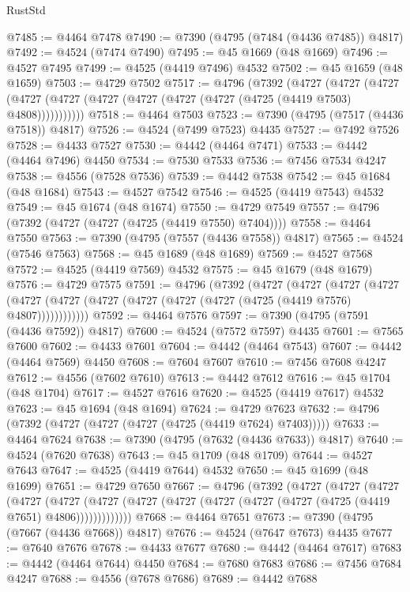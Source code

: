\begin{lexlean}{RustStd}
\begin{coremodule}
@7485 := @4464 @7478
@7490 := @7390 (@4795 (@7484 (@4436 @7485)) @4817)
@7492 := @4524 (@7474 @7490)
@7495 := @45 @1669 (@48 @1669)
@7496 := @4527 @7495
@7499 := @4525 (@4419 @7496) @4532
@7502 := @45 @1659 (@48 @1659)
@7503 := @4729 @7502
@7517 := @4796
    (@7392
      (@4727
        (@4727
          (@4727 (@4727 (@4727 (@4727 (@4727 (@4727 (@4727 (@4725 (@4419 @7503) @4808)))))))))))
@7518 := @4464 @7503
@7523 := @7390 (@4795 (@7517 (@4436 @7518)) @4817)
@7526 := @4524 (@7499 @7523) @4435
@7527 := @7492 @7526
@7528 := @4433 @7527
@7530 := @4442 (@4464 @7471)
@7533 := @4442 (@4464 @7496) @4450
@7534 := @7530 @7533
@7536 := @7456 @7534 @4247
@7538 := @4556 (@7528 @7536)
@7539 := @4442 @7538
@7542 := @45 @1684 (@48 @1684)
@7543 := @4527 @7542
@7546 := @4525 (@4419 @7543) @4532
@7549 := @45 @1674 (@48 @1674)
@7550 := @4729 @7549
@7557 := @4796 (@7392 (@4727 (@4727 (@4725 (@4419 @7550) @7404))))
@7558 := @4464 @7550
@7563 := @7390 (@4795 (@7557 (@4436 @7558)) @4817)
@7565 := @4524 (@7546 @7563)
@7568 := @45 @1689 (@48 @1689)
@7569 := @4527 @7568
@7572 := @4525 (@4419 @7569) @4532
@7575 := @45 @1679 (@48 @1679)
@7576 := @4729 @7575
@7591 := @4796
    (@7392
      (@4727
        (@4727
          (@4727
            (@4727 (@4727 (@4727 (@4727 (@4727 (@4727 (@4727 (@4725 (@4419 @7576) @4807))))))))))))
@7592 := @4464 @7576
@7597 := @7390 (@4795 (@7591 (@4436 @7592)) @4817)
@7600 := @4524 (@7572 @7597) @4435
@7601 := @7565 @7600
@7602 := @4433 @7601
@7604 := @4442 (@4464 @7543)
@7607 := @4442 (@4464 @7569) @4450
@7608 := @7604 @7607
@7610 := @7456 @7608 @4247
@7612 := @4556 (@7602 @7610)
@7613 := @4442 @7612
@7616 := @45 @1704 (@48 @1704)
@7617 := @4527 @7616
@7620 := @4525 (@4419 @7617) @4532
@7623 := @45 @1694 (@48 @1694)
@7624 := @4729 @7623
@7632 := @4796 (@7392 (@4727 (@4727 (@4727 (@4725 (@4419 @7624) @7403)))))
@7633 := @4464 @7624
@7638 := @7390 (@4795 (@7632 (@4436 @7633)) @4817)
@7640 := @4524 (@7620 @7638)
@7643 := @45 @1709 (@48 @1709)
@7644 := @4527 @7643
@7647 := @4525 (@4419 @7644) @4532
@7650 := @45 @1699 (@48 @1699)
@7651 := @4729 @7650
@7667 := @4796
    (@7392
      (@4727
        (@4727
          (@4727
            (@4727
              (@4727
                (@4727 (@4727 (@4727 (@4727 (@4727 (@4727 (@4725 (@4419 @7651) @4806)))))))))))))
@7668 := @4464 @7651
@7673 := @7390 (@4795 (@7667 (@4436 @7668)) @4817)
@7676 := @4524 (@7647 @7673) @4435
@7677 := @7640 @7676
@7678 := @4433 @7677
@7680 := @4442 (@4464 @7617)
@7683 := @4442 (@4464 @7644) @4450
@7684 := @7680 @7683
@7686 := @7456 @7684 @4247
@7688 := @4556 (@7678 @7686)
@7689 := @4442 @7688

\end{coremodule}
\end{lexlean}
